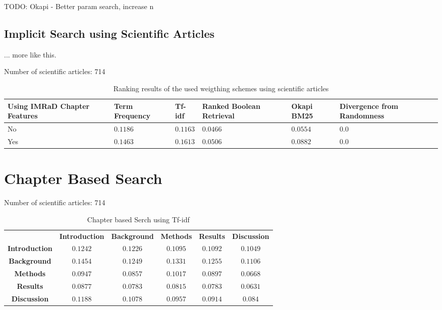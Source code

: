 TODO: Okapi - Better param search, increase n

\subsection{Implicit Search using Scientific Articles}

... more like this.

Number of scientific articles: 714

\begin{table}
    \begin{adjustwidth}{-1.9cm}{}
    \begin{tabular}{ C{2.5cm} C{2.5cm} C{2.5cm} C{2.5cm} C{2.5cm} C{2.5cm} }
      \toprule
      \textbf{Using IMRaD Chapter Features} & \textbf{Term Frequency} & \textbf{Tf-idf} & \textbf{Ranked Boolean Retrieval} & \textbf{Okapi BM25} & \textbf{Divergence from Randomness} \\ \midrule
      No  & $0.1186$ & $0.1163$ & $0.0466$ & $0.0554$ & $0.0$ \\
      Yes & $0.1463$ & $0.1613$ & $0.0506$ & $0.0882$ & $0.0$ \\
      \bottomrule
    \end{tabular}
  \caption[Ranking results using scientific articles]{Ranking results of the used weigthing schemes using scientific articles}
  \label{tbl:ranking_result_full}
  \end{adjustwidth}
\end{table}


\section{Chapter Based Search}

Number of scientific articles: 714

\begin{table}
  \centering
  \begin{tabular}{ c c c c c c }
    \toprule
     & \textbf{Introduction} & \textbf{Background} & \textbf{Methods} & \textbf{Results} & \textbf{Discussion} \\
    \textbf{Introduction} & $0.1242$ & $0.1226$ & $0.1095$ & $0.1092$ & $0.1049$ \\
    \textbf{Background}   & $0.1454$ & $0.1249$ & $0.1331$ & $0.1255$ & $0.1106$ \\
    \textbf{Methods}      & $0.0947$ & $0.0857$ & $0.1017$ & $0.0897$ & $0.0668$ \\
    \textbf{Results}      & $0.0877$ & $0.0783$ & $0.0815$ & $0.0783$ & $0.0631$ \\
    \textbf{Discussion}   & $0.1188$ & $0.1078$ & $0.0957$ & $0.0914$ & $0.084$  \\
    \bottomrule
  \end{tabular}
  \caption[Chapter based Serch using Tf-idf]{Chapter based Serch using Tf-idf}
  \label{tbl:ranking_result_full}
\end{table}

